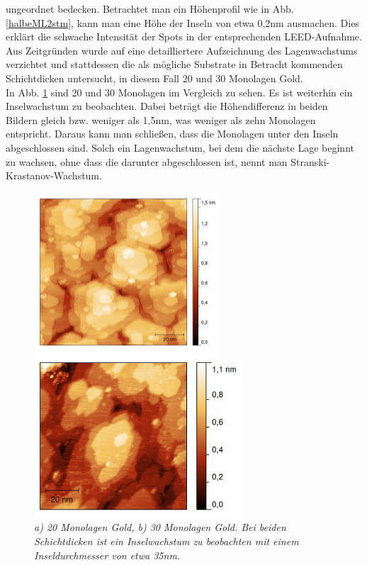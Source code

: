 \FloatBarrier

ungeordnet bedecken.
Betrachtet man ein Höhenprofil wie in Abb. \ref{halbeML2stm}, kann man eine Höhe der Inseln von
etwa 0,2nm ausmachen. Dies erklärt die schwache Intensität der Spots in der entsprechenden
LEED-Aufnahme. \\
Aus Zeitgründen wurde auf eine detailliertere Aufzeichnung des Lagenwachstums
verzichtet und stattdessen die als mögliche Substrate in Betracht kommenden Schichtdicken untersucht, in diesem
Fall 20 und 30 Monolagen Gold.\\
In Abb. \ref{MLVergleich} sind 20 und 30 Monolagen im Vergleich zu sehen. Es ist weiterhin ein
Inselwachstum zu beobachten.  Dabei beträgt die Höhendifferenz in beiden Bildern gleich bzw. weniger
als 1,5nm, was weniger als zehn Monolagen entspricht. Daraus kann man schließen, dass die Monolagen
unter den Inseln abgeschlossen sind. Solch ein Lagenwachstum, bei dem die nächste Lage beginnt zu
wachsen, ohne dass die darunter abgeschlossen ist, nennt man Stranski-Krastanov-Wachstum.


\begin{figure}[htbp]
	\begin{minipage}[b]{0.5\textwidth} 
		\includegraphics[height=6cm]{20ML.jpg}
	\end{minipage}
	\hfill
	\begin{minipage}[b]{0.5\textwidth}
		\includegraphics[height=6cm]{30ML.jpg}
	\end{minipage}
	\caption{\textit{a) 20 Monolagen Gold, b) 30 Monolagen Gold. Bei beiden Schichtdicken ist ein
	Inselwachstum zu beobachten mit einem Inseldurchmesser von etwa 35nm.}}
	\label{MLVergleich} 
\end{figure}

